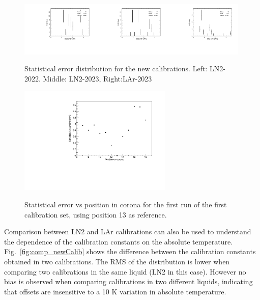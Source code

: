 \begin{figure}[htbp]
    \centering
    {\includegraphics[width=0.33\textwidth]{images/LN22.pdf}}{\includegraphics[width=0.33\textwidth]{images/LN23.pdf}}{\includegraphics[width=0.33\textwidth]{images/Lar2023.pdf}}
    \caption{Statistical error distribution for the new calibrations. Left: LN2-2022. Middle: LN2-2023, Right:LAr-2023}
    \label{fig:newCalib_stat}
    \end{figure}

\begin{figure}[htbp]
\centering
{\includegraphics[width=0.65\textwidth]{images/figure_18.pdf}}
\caption{Statistical error vs position in corona for the first run of the first calibration set, using position 13 as reference.}
\label{fig:newCalib_statVsChannel}
\end{figure}

Comparison between LN2 and LAr calibrations can also be used to understand the dependence of the calibration constants on the absolute temperature. Fig.~\ref{fig:comp_newCalib} shows the difference between the calibration constants obtained in two calibrations. The RMS of the distribution is lower when comparing two calibrations in the same liquid (LN2 in this case). However no bias is observed when comparing calibrations in two different liquids, indicating that offsets are insensitive to a 10 K variation in absolute temperature.

